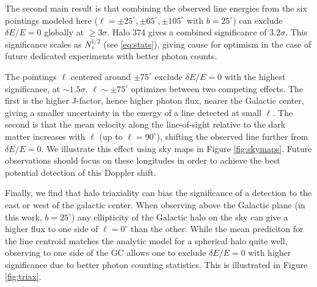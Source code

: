 \documentclass[aps,prd,10pt,twocolumn,superscriptaddress,showpacs]{revtex4-1}
\begin{document}
The second main result is that combining the observed line energies from the six pointings modeled
here ($\ell=\pm25^\circ,\pm65^\circ,\pm105^\circ$ with $b=25^\circ$) can exclude
$\delta E/E = 0$ globally at $\geq 3\sigma$.  Halo 374 gives a combined significance of
$3.2\sigma$. This significance scales as $N_s^{1/2}$ (see \eqref{eq:stats}), giving cause for
optimism in the case of future dedicated experiments with better photon counts.

The pointings $\ell$ centered around $\pm75^\circ$ exclude $\delta E/E=0$ with 
the highest significance, at $\sim 1.5\sigma$. $\ell\sim\pm75^\circ$ optimizes between two
competing effects. The first is the higher J-factor, hence higher
photon flux, nearer the Galactic center, giving a smaller uncertainty in the energy of a line
detected at small $\ell$. The second is that the mean velocity along the line-of-sight relative to
the dark matter increases with $\ell$ (up to $\ell=90^\circ$), shifting the observed line further
from $\delta E/E=0$. We illustrate this effect using sky maps in Figure \ref{fig:skymaps}.
Future observations should focus on these longitudes
in order to achieve the best potential detection of this Doppler shift.

Finally, we find that halo triaxiality can bias the significance of a detection to
the east or west of the galactic center. When observing above the Galactic plane (in this work,
$b=25^\circ$) any ellipticity of the Galactic halo on the sky can give a higher flux to one side of
$\ell=0^\circ$ than the other. While the mean prediciton for the line centroid matches the analytic model
for a spherical halo quite well, observing to one side of the GC allows one to exclude $\delta
E/E=0$ with higher significance due to better photon counting statistics. This is illustrated in Figure \ref{fig:triax}.
\end{document}
